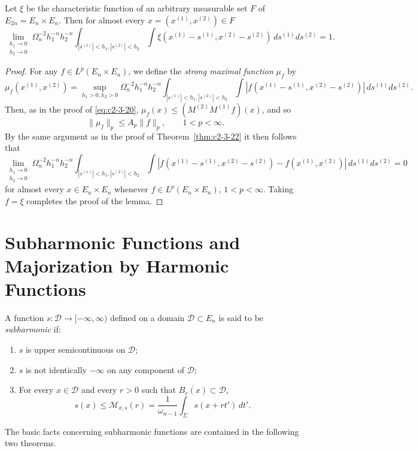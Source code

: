 \begin{lemma}\label{lem:c2-3-27}
Let $\xi$ be the characteristic function of an arbitrary measurable set $F$ of $E_{2n} = E_n \times E_n$. Then for almost every $x = (x^{(1)}, x^{(2)}) \in F$
\[
\lim_{\substack{h_1 \to 0 \\ h_2 \to 0}} \Omega_n^{-2} h_1^{-n} h_2^{-n} \int_{|s^{(1)}| < h_1, |s^{(2)}| < h_2} \int \xi(x^{(1)} - s^{(1)}, x^{(2)} - s^{(2)})\,ds^{(1)} ds^{(2)} = 1.
\]
\end{lemma}

\begin{proof}
For any $f \in L^p(E_n \times E_n)$, we define the \emph{strong maximal function} $\mu_f$ by
\[
\mu_f(x^{(1)}, x^{(2)}) = \sup_{h_1 > 0, h_2 > 0} \Omega_n^{-2} h_1^{-n} h_2^{-n} \int_{|s^{(1)}| < h_1, |s^{(2)}| < h_2} \int |f(x^{(1)} - s^{(1)}, x^{(2)} - s^{(2)})|\,ds^{(1)} ds^{(2)}.
\]
Then, as in the proof of \eqref{eq:c2-3-20}, $\mu_f(x) \leq (M^{(2)} M^{(1)} f)(x)$, and so
\begin{equation}\label{eq:c2-3-28}
\|\mu_f\|_p \leq A_p \|f\|_p, \qquad 1 < p < \infty.
\end{equation}
By the same argument as in the proof of Theorem~\ref{thm:c2-3-22} it then follows that
\begin{equation}\label{eq:c2-3-29}
\lim_{\substack{h_1 \to 0 \\ h_2 \to 0}} \Omega_n^{-2} h_1^{-n} h_2^{-n} \int_{|s^{(1)}| < h_1, |s^{(2)}| < h_2} \int |f(x^{(1)} - s^{(1)}, x^{(2)} - s^{(2)}) - f(x^{(1)}, x^{(2)})|\,ds^{(1)} ds^{(2)} = 0
\end{equation}
for almost every $x \in E_n \times E_n$ whenever $f \in L^p(E_n \times E_n)$, $1 < p < \infty$. Taking $f = \xi$ completes the proof of the lemma.
\end{proof}

\section{Subharmonic Functions and Majorization by Harmonic Functions}

A function $s : \mathcal{D} \to [-\infty, \infty)$ defined on a domain $\mathcal{D} \subset E_n$ is said to be \emph{subharmonic} if:
\begin{enumerate}
\item[(1)] $s$ is upper semicontinuous on $\mathcal{D}$;
\item[(2)] $s$ is not identically $-\infty$ on any component of $\mathcal{D}$;
\item[(3)] For every $x \in \mathcal{D}$ and every $r > 0$ such that $\overline{B_r(x)} \subset \mathcal{D}$,
\begin{equation}\label{eq:c2-4-1}
s(x) \leq \mathcal{M}_{x,s}(r) = \frac{1}{\omega_{n-1}} \int_\Sigma s(x + rt')\,dt'.
\end{equation}
\end{enumerate}
The basic facts concerning subharmonic functions are contained in the following two theorems.

